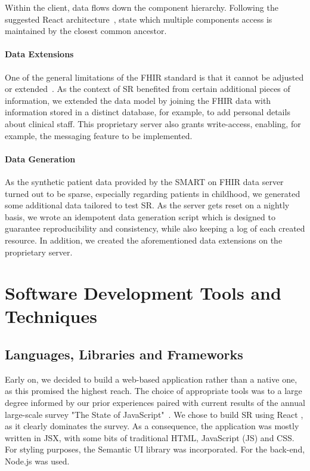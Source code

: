 \documentclass[sigconf]{acmart}
\begin{document}
Within the client, data flows down the component hierarchy. Following the suggested React architecture~\cite{react-lifting-state}, state which multiple components access is maintained by the closest common ancestor.


\paragraph{Data Extensions}

One of the general limitations of the FHIR standard is that it cannot be adjusted or extended~\cite{fhir-official}. As the context of SR benefited from certain additional pieces of information, we extended the data model by joining the FHIR data with information stored in a distinct database, for example, to add personal details about clinical staff. This proprietary server also grants  write-access, enabling, for example, the messaging feature to be implemented.


\paragraph{Data Generation}

As the synthetic patient data provided by the SMART on FHIR data server turned out to be sparse, especially regarding patients in childhood, we generated some additional data tailored to test SR. As the server gets reset on a nightly basis, we wrote an idempotent data generation script which is designed to guarantee reproducibility and consistency, while also keeping a log of each created resource. In addition, we created the aforementioned data extensions on the proprietary server.


\section{Software Development Tools and Techniques}
\label{sec:tools-and-techniques}


\subsection{Languages, Libraries and Frameworks}
\label{sec:languages}

Early on, we decided to build a web-based application rather than a native one, as this promised the highest reach. %
The choice of appropriate tools was to a large degree informed by our prior experiences paired with current results of the annual large-scale survey "The State of JavaScript"~\cite{state-of-js}. We chose to build SR using React%
, as it clearly dominates the survey. As a consequence, the application was mostly written in JSX, with some bits of traditional HTML, JavaScript (JS) and CSS. For styling purposes, the Semantic UI library was incorporated. For the back-end, Node.js was used.
\end{document}
